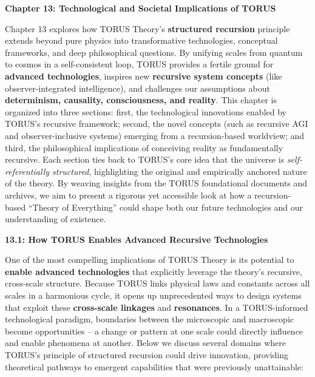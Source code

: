\documentclass[
]{article}
\author{}
\date{}
\begin{document}
\textbf{Chapter 13: Technological and Societal Implications of TORUS}

Chapter 13 explores how TORUS Theory's \textbf{structured recursion}
principle extends beyond pure physics into transformative technologies,
conceptual frameworks, and deep philosophical questions. By unifying
scales from quantum to cosmos in a self-consistent loop, TORUS provides
a fertile ground for \textbf{advanced technologies}, inspires new
\textbf{recursive system concepts} (like observer-integrated
intelligence), and challenges our assumptions about \textbf{determinism,
causality, consciousness, and reality}. This chapter is organized into
three sections: first, the technological innovations enabled by TORUS's
recursive framework; second, the novel concepts (such as recursive AGI
and observer-inclusive systems) emerging from a recursion-based
worldview; and third, the philosophical implications of conceiving
reality as fundamentally recursive. Each section ties back to TORUS's
core idea that the universe is \emph{self-referentially structured},
highlighting the original and empirically anchored nature of the theory.
By weaving insights from the TORUS foundational documents and archives,
we aim to present a rigorous yet accessible look at how a
recursion-based ``Theory of Everything'' could shape both our future
technologies and our understanding of existence.

\textbf{13.1: How TORUS Enables Advanced Recursive Technologies}

One of the most compelling implications of TORUS Theory is its potential
to \textbf{enable advanced technologies} that explicitly leverage the
theory's recursive, cross-scale structure. Because TORUS links physical
laws and constants across all scales in a harmonious cycle, it opens up
unprecedented ways to design systems that exploit these
\textbf{cross-scale linkages} and \textbf{resonances}. In a
TORUS-informed technological paradigm, boundaries between the
microscopic and macroscopic become opportunities -- a change or pattern
at one scale could directly influence and enable phenomena at another.
Below we discuss several domains where TORUS's principle of structured
recursion could drive innovation, providing theoretical pathways to
emergent capabilities that were previously unattainable:
\end{document}
